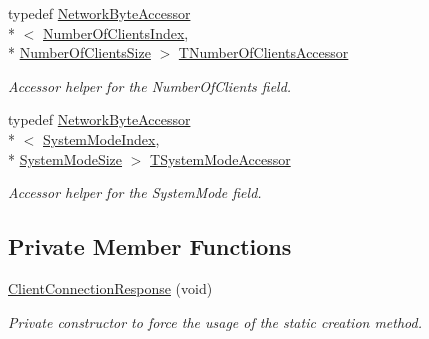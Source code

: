 \begin{DoxyCompactItemize}
typedef \hyperlink{class_terra_swarm_1_1_network_byte_accessor}{Network\-Byte\-Accessor}\\*
$<$ \hyperlink{class_terra_swarm_1_1_asynchronous_1_1_client_connection_response_a696e860584893543721be9624b7114fca00327ef493fd38258f86303295b076e3}{Number\-Of\-Clients\-Index}, \\*
\hyperlink{class_terra_swarm_1_1_asynchronous_1_1_client_connection_response_a059519ab548bdfbe546b4583c5174fe1a2723f340b52e7a61e4ed178a70f167df}{Number\-Of\-Clients\-Size} $>$ \hyperlink{class_terra_swarm_1_1_asynchronous_1_1_client_connection_response_a6740a3389ab57cb4968a15ecf405fd8e}{T\-Number\-Of\-Clients\-Accessor}
\begin{DoxyCompactList}\small\item\em Accessor helper for the Number\-Of\-Clients field. \end{DoxyCompactList}\item 
typedef \hyperlink{class_terra_swarm_1_1_network_byte_accessor}{Network\-Byte\-Accessor}\\*
$<$ \hyperlink{class_terra_swarm_1_1_asynchronous_1_1_client_connection_response_a696e860584893543721be9624b7114fcaab080fba23b3393ae7737f430dcfe830}{System\-Mode\-Index}, \\*
\hyperlink{class_terra_swarm_1_1_asynchronous_1_1_client_connection_response_a059519ab548bdfbe546b4583c5174fe1a837dd622de291c559f0cdd336d8c4644}{System\-Mode\-Size} $>$ \hyperlink{class_terra_swarm_1_1_asynchronous_1_1_client_connection_response_a248ac200307842dee28bd5b5cfec47da}{T\-System\-Mode\-Accessor}
\begin{DoxyCompactList}\small\item\em Accessor helper for the System\-Mode field. \end{DoxyCompactList}\end{DoxyCompactItemize}
\subsection*{Private Member Functions}
\begin{DoxyCompactItemize}
\item 
\hyperlink{class_terra_swarm_1_1_asynchronous_1_1_client_connection_response_ae1af37cee2cfdc1c258573a5cc679830}{Client\-Connection\-Response} (void)
\begin{DoxyCompactList}\small\item\em Private constructor to force the usage of the static creation method. \end{DoxyCompactList}\end{DoxyCompactItemize}


